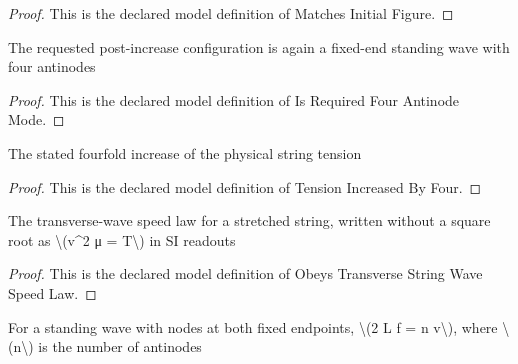 \begin{proof}
  This is the declared model definition of Matches Initial Figure.
\end{proof}
\begin{definition}
  \label{def:physics:phyx-mini-0178:phyxminiproblems-problemphyxmini0178-isrequiredfourantinodemode}
  The requested post-increase configuration is again a fixed-end standing wave with four antinodes
\end{definition}
\begin{proof}
  This is the declared model definition of Is Required Four Antinode Mode.
\end{proof}
\begin{definition}
  \label{def:physics:phyx-mini-0178:phyxminiproblems-problemphyxmini0178-tensionincreasedbyfour}
  The stated fourfold increase of the physical string tension
\end{definition}
\begin{proof}
  This is the declared model definition of Tension Increased By Four.
\end{proof}
\begin{definition}
  \label{def:physics:phyx-mini-0178:phyxminiproblems-problemphyxmini0178-obeystransversestringwavespeedlaw}
  The transverse-wave speed law for a stretched string, written without a square root as \textbackslash{}(v\textasciicircum{}2 μ = T\textbackslash{}) in SI readouts
\end{definition}
\begin{proof}
  This is the declared model definition of Obeys Transverse String Wave Speed Law.
\end{proof}
\begin{definition}
  \label{def:physics:phyx-mini-0178:phyxminiproblems-problemphyxmini0178-obeysfixedendstandingwavelaw}
  For a standing wave with nodes at both fixed endpoints, \textbackslash{}(2 L f = n v\textbackslash{}), where \textbackslash{}(n\textbackslash{}) is the number of antinodes
\end{definition}
